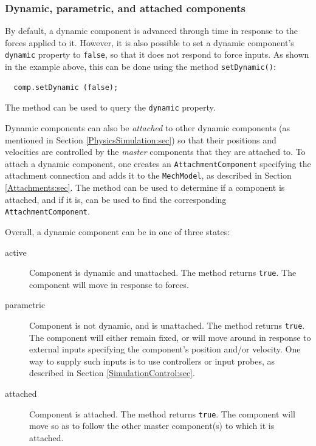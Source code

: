 \subsubsection{Dynamic, parametric, and attached components}
\label{DynamicVsParametric:sec}

By default, a dynamic component is advanced through time in response
to the forces applied to it. However, it is also possible to set a
dynamic component's {\tt dynamic} property to {\tt false}, so that it
does not respond to force inputs.  As shown in the example above, this
can be done using the method
{\tt setDynamic()}:
%
\begin{verbatim}
  comp.setDynamic (false);
\end{verbatim}
%
The method
can be used to query the {\tt dynamic} property.

Dynamic components can also be {\it attached} to other dynamic
components (as mentioned in Section \ref{PhysicsSimulation:sec}) so
that their positions and velocities are controlled by the {\it master}
components that they are attached to.  To attach a dynamic component,
one creates an {\tt AttachmentComponent} specifying the attachment
connection and adds it to the {\tt MechModel}, as described in Section
\ref{Attachments:sec}.  The method
can be used to determine if a component is attached, and if it is,
can be used to find the corresponding {\tt AttachmentComponent}.

Overall, a dynamic component can be in one of three states:

\begin{description}

\item[active]\mbox{}

Component is dynamic and unattached. The method
returns {\tt true}. The component will move in response to forces.

\item[parametric]\mbox{}

Component is not dynamic, and is unattached. 
The method
returns {\tt true}.
The component will either remain
fixed, or will move around in response to external inputs specifying
the component's position and/or velocity. One way to supply such
inputs is to use controllers or input probes, as described in
Section \ref{SimulationControl:sec}.

\item[attached]\mbox{}

Component is attached. The method
returns {\tt true}. The component will move so as to follow the other
master component(s) to which it is attached.

\end{description}

